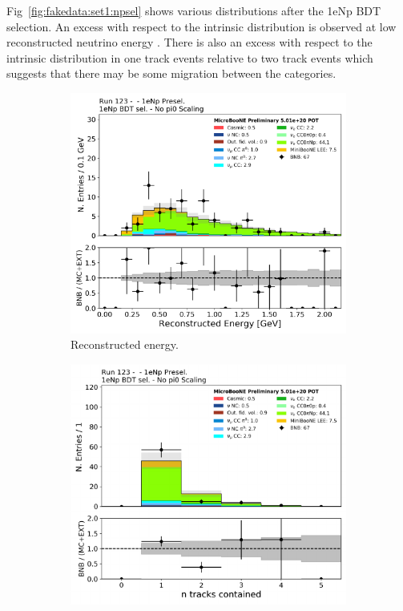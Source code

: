 Fig~\ref{fig:fakedata:set1:npsel} shows various distributions after the 1eNp BDT selection.  An excess with respect to the \nue intrinsic distribution is observed at low reconstructed neutrino energy . There is also an excess with respect to the \nue intrinsic distribution in one track events relative to two track events which suggests that there may be some migration between the categories.

\begin{figure}[H] 
\begin{center}
    \begin{subfigure}[b]{0.45\textwidth}
    \centering
    \includegraphics[width=1.00\textwidth]{Fakedata/set1/Np_postsel_recoe.pdf}
    \caption{\label{fig:fakedata:set1:Np_postsel_recoe} Reconstructed energy.}
    \end{subfigure}
    \begin{subfigure}[b]{0.45\textwidth}
    \centering
    \includegraphics[width=1.00\textwidth]{Fakedata/set1/Np_postsel_ntracks.pdf}

\end{subfigure}
\end{center}
\end{figure}
